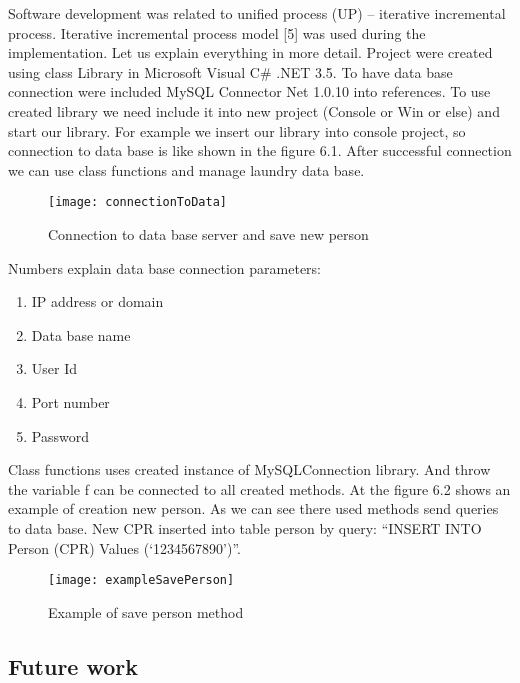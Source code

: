 Software development was related to unified process (UP) – iterative incremental process.  Iterative incremental process model [5] was used during the implementation.  
Let us explain everything in more detail. Project were created using class Library in Microsoft Visual C\# .NET 3.5. To have data base connection were included MySQL Connector Net 1.0.10 into references. To use created library we need include it into new project (Console or Win or else) and start our library. For example we insert our library into console project, so connection to data base is like shown in the figure 6.1. After successful connection we can use class functions and manage laundry data base. 

\begin{figure}[h]
	\centering
		\texttt{[image: connectionToData]}
	\caption{Connection to data base server and save new person}
	\label{fig:planning}
\end{figure}

Numbers explain data base connection parameters:

\begin{enumerate}
	\item IP address or domain
	\item Data base name
	\item User Id
	\item Port number
	\item Password
\end{enumerate}

Class functions uses created instance of MySQLConnection library. And throw the variable f can be connected to all created methods. At the figure 6.2 shows an example of creation new person. As we can see there used methods send queries to data base. New CPR inserted into table person by query: “INSERT INTO Person (CPR) Values (‘1234567890’)”.

\begin{figure}[h]
	\centering
		\texttt{[image: exampleSavePerson]}
	\caption{Example of save person method}
	\label{fig:planning}
\end{figure}

\subsection{Future work}